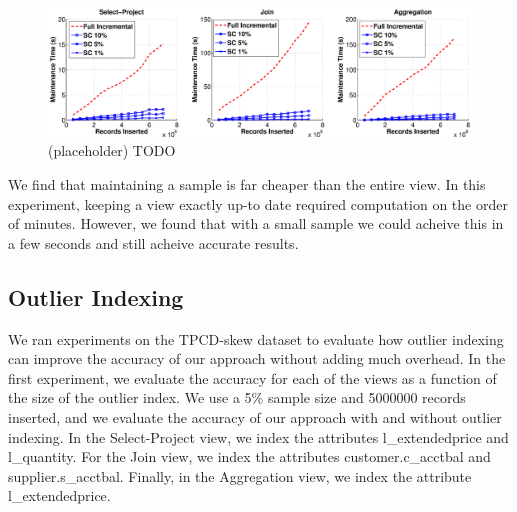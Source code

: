 \begin{figure}[ht!]
\label{exp3dist}
\centering
\includegraphics[width=\textwidth]{exp/exp4-efficiency-tpcd-skew.eps}
 \caption{(placeholder) TODO}
\end{figure}

We find that maintaining a sample is far cheaper than the entire view. In this experiment, keeping a view exactly up-to date required computation on the order of minutes.
However, we found that with a small sample we could acheive this in a few seconds and still acheive accurate results.

\subsection{Outlier Indexing}
We ran experiments on the TPCD-skew dataset to evaluate how outlier indexing can improve the accuracy of our approach without adding much overhead.
In the first experiment, we evaluate the accuracy for each of the views as a function of the size of the outlier index. 
We use a 5\% sample size and 5000000 records inserted, and we evaluate the accuracy of our approach with and without outlier indexing.
In the Select-Project view, we index the attributes l\_extendedprice and l\_quantity.
For the Join view, we index the attributes customer.c\_acctbal and supplier.s\_acctbal.
Finally, in the Aggregation view, we index the attribute l\_extendedprice.

